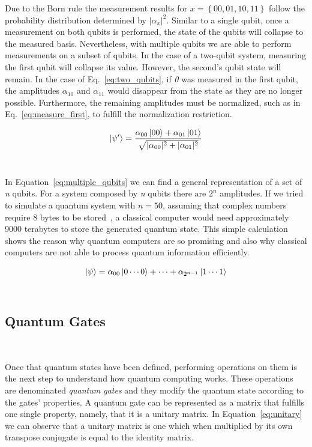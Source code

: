 Due to the Born rule the measurement results for
\(x = \left\{00, 01, 10, 11\right\}\) follow the probability
distribution determined by \(|\alpha_{x}|^2\). Similar to a
single qubit, once a measurement on both qubits is performed,
the state of the qubits will collapse to the measured
basis. Nevertheless, with multiple qubits we are able to perform
measurements on a subset of qubits. In the case of a two-qubit
system, measuring the first qubit will collapse its value. However,
the second's qubit state will remain. In the case of Eq.~\ref{eq:two_qubits},
if \textit{0} was measured in the first qubit, the amplitudes \(\alpha_{10}\)
and \(\alpha_{11}\) would disappear from the state as they are no longer
possible. Furthermore, the remaining amplitudes must be normalized,
such as in Eq.~\ref{eq:measure_first}, to fulfill the normalization
restriction.  \

\begin{equation}\label{eq:measure_first}
  \ket{\psi'} = \frac{\alpha_{00}\ket{00} + \alpha_{01}\ket{01}}
                    {\sqrt{|\alpha_{00}|^2 + |\alpha_{01}|^2}}
\end{equation} \

In Equation~\ref*{eq:multiple_qubits} we can find a general representation of
a set of \textit{n} qubits. For a system composed by \textit{n} qubits there are \(2^n\)
amplitudes. If we tried to simulate a quantum system with \(n = 50\), assuming
that complex numbers require 8 bytes to be stored~\cite{harris_array_2020}, a classical computer would need
approximately 9000 terabytes to store the generated quantum state. This simple calculation
shows the reason why quantum computers are so promising and also why classical computers
are not able to process quantum information efficiently. \

\begin{equation}\label{eq:multiple_qubits}
  \ket{\psi} = \alpha_{00}\ket{0\cdots0} + \cdots + \alpha_{2^{n-1}}\ket{1\cdots1}
\end{equation} \

\subsection{Quantum Gates}\label{subsection:gates}\

Once that quantum states have been defined, performing operations
on them is the next step to understand how quantum computing works.
These operations are denominated \textit{quantum gates} and they
modify the quantum state according to the gates' properties. A quantum gate
can be represented as a matrix that fulfills one single property,
namely, that it is a unitary matrix. In Equation~\ref{eq:unitary} we
can observe that a unitary matrix is one which when multiplied by its
own transpose conjugate is equal to the identity matrix.

